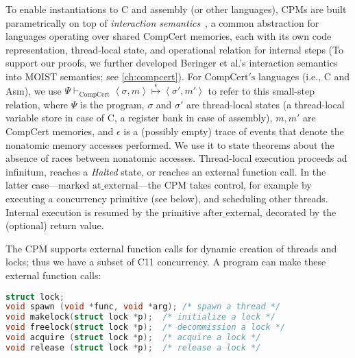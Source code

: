 To enable instantiations to C and assembly (or other
languages), CPMs are built parametrically on top of \emph{interaction
  semantics}~\cite{bsda:esop2014},
   a common abstraction for languages
operating over shared CompCert memories, each with its own code
representation, thread-local state, and operational relation for
internal steps (To support our proofs, we further developed Beringer et al.'s interaction semantics into MOIST semantics; see \cref{ch:compcert}). For $\mathrm{CompCert's}$ languages (i.e., C and Asm),
we use
\( \Psi \vdash_\mathrm{CompCert} \left<\sigma,m \right>
\stackrel{\epsilon}\mapsto \left<\sigma',m'\right> \)
to refer to this small-step relation, where $\Psi$ is the program, 
$\sigma$ and $\sigma'$ are thread-local states (a
thread-local variable store in case of C, a register bank in case of
assembly), $m, m'$ are CompCert memories, and $\epsilon$ is a
(possibly empty) trace of events that denote the nonatomic memory
accesses performed. We use it to state theorems about the absence
of races between nonatomic accesses. Thread-local execution proceeds
ad infinitum, reaches a \emph{Halted} state, or reaches an
external function call. In the latter case---marked
$\mathrm{at\_external}$---the CPM takes control, for example by
executing a concurrency primitive (see below), and scheduling other
threads. Internal execution is resumed by the primitive
$\mathrm{after\_external}$, decorated by the (optional) return value.

The CPM supports external function calls for
dynamic creation of threads and locks; thus we have a subset of
C11 concurrency.  A program can make these external
function calls:

\begin{lstlisting}[language=C]
struct lock;
void spawn (void *func, void *arg); /* spawn a thread */
void makelock(struct lock *p);  /* initialize a lock */
void freelock(struct lock *p);  /* decommission a lock */
void acquire (struct lock *p);  /* acquire a lock */
void release (struct lock *p);  /* release a lock */
\end{lstlisting}


